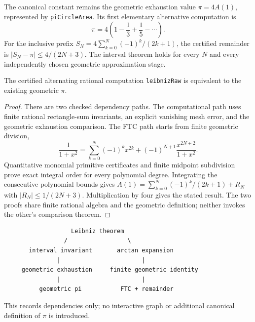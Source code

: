 The canonical constant remains the geometric exhaustion value
$\pi=4A(1)$, represented by \texttt{piCircleArea}.  Its first elementary
alternative computation is
\[
  \pi=4\left(1-\frac13+\frac15-\cdots\right).
\]
For the inclusive prefix $S_N=4\sum_{k=0}^{N}(-1)^k/(2k+1)$, the certified
remainder is $|S_N-\pi|\leq 4/(2N+3)$.  The interval theorem holds for every
$N$ and every independently chosen geometric approximation stage.

\begin{theorem}
\label{thm:leibniz-geometric-benchmark}
\leanok
The certified alternating rational computation \texttt{leibnizRaw} is
 equivalent to the existing geometric $\pi$.
\end{theorem}

\begin{proof}
There are two checked dependency paths.  The computational path uses finite
rational rectangle-sum invariants, an explicit vanishing mesh error, and the
geometric exhaustion comparison.  The FTC path starts from finite geometric
division,
\[
 \frac{1}{1+x^2}=\sum_{k=0}^{N}(-1)^k x^{2k}
       +(-1)^{N+1}\frac{x^{2N+2}}{1+x^2}.
\]
Quantitative monomial primitive certificates and finite midpoint subdivision
prove exact integral order for every polynomial degree.  Integrating the
consecutive polynomial bounds gives $A(1)=\sum_{k=0}^{N}(-1)^k/(2k+1)+R_N$
with $|R_N|\leq 1/(2N+3)$.  Multiplication by four gives the stated result.
The two proofs share finite rational algebra and the geometric definition;
neither invokes the other's comparison theorem.
\end{proof}

\leanok

\begin{verbatim}
                   Leibniz theorem
                 /                 \
       interval invariant       arctan expansion
               |                       |
     geometric exhaustion     finite geometric identity
               |                       |
          geometric pi           FTC + remainder
\end{verbatim}
This records dependencies only; no interactive graph or additional
canonical definition of $\pi$ is introduced.

